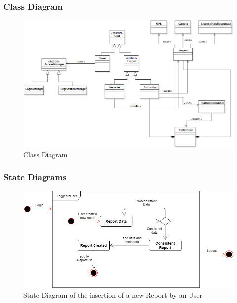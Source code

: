 \vspace{40px}      

\subsubsection{Class Diagram}
    \begin{figure}[h]
        \centering
        \includegraphics[scale=0.5]{Images/ClassDiag.png}
        \caption{Class Diagram}
    \end{figure}

\newpage

\subsubsection{State Diagrams}
    \begin{figure}[h]
        \centering
        \includegraphics[scale=0.5]{Images/StateDiag_addReport.png}
        \caption{State Diagram of the insertion of a new Report by an User}
    \end{figure}
    
    \vspace{30px}
    
